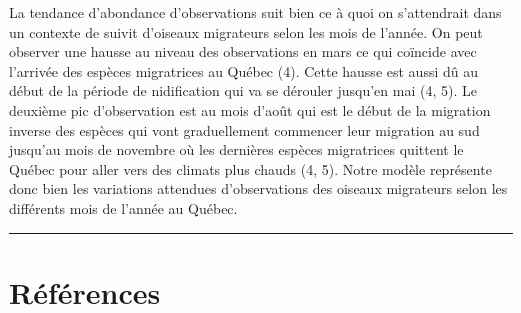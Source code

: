 \documentclass[9pt,twocolumn,twoside,]{pnas-new}
\begin{document}
La tendance d'abondance d'observations suit bien ce à quoi on
s'attendrait dans un contexte de suivit d'oiseaux migrateurs selon les
mois de l'année. On peut observer une hausse au niveau des observations
en mars ce qui coïncide avec l'arrivée des espèces migratrices au Québec
(4). Cette hausse est aussi dû au début de la période de nidification
qui va se dérouler jusqu'en mai (4, 5). Le deuxième pic d'observation
est au mois d'août qui est le début de la migration inverse des espèces
qui vont graduellement commencer leur migration au sud jusqu'au mois de
novembre où les dernières espèces migratrices quittent le Québec pour
aller vers des climats plus chauds (4, 5). Notre modèle représente donc
bien les variations attendues d'observations des oiseaux migrateurs
selon les différents mois de l'année au Québec.

\begin{center}\rule{0.5\linewidth}{0.5pt}\end{center}

\showmatmethods

\hypertarget{references}{%
\section*{Références}\label{references}}

\pnasbreak
\end{document}
